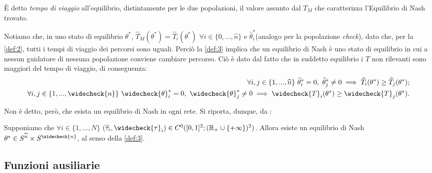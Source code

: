È detto \textit{tempo di viaggio} all'equilibrio, distintamente per le due popolazioni, il valore assunto dal $T_M$ che caratterizza l'Equilibrio di Nash trovato.

Notiamo che, in uno stato di equilibrio $\theta^*$, $\widehat{T}_M(\theta^*)=\widehat{T}_i(\theta^*)$ $\forall i\in\{0,...,\widehat{n}\}$ e $\widehat{\theta}^*_i$(analogo per la popolazione \textit{check}),
dato che, per la \autoref{def:2}, tutti i tempi di viaggio dei percorsi sono uguali. Perciò la \autoref{def:3}
implica che un equilibrio di Nash è uno stato di equilibrio in cui a nessun guidatore di nessuna popolazione conviene cambiare percorso.
Ciò è dato dal fatto che in suddetto equilibrio i $T$ non rilevanti sono 
maggiori del tempo di viaggio, di conseguenza:
\begin{equation*}
    \begin{split}
    \forall i,j\in\{1,...,\widehat{n}\}\text{ }\widehat{\theta}_i^{*}=0,\text{ }\widehat{\theta}_j^*\neq0\implies\widehat{T}_i(\theta^*)\geq\widehat{T}_j(\theta^*);\\
    \forall i,j\in\{1,...,\widecheck{n}\}\text{ }\widecheck{\theta}_i^{*}=0,\text{ }\widecheck{\theta}_j^*\neq0\implies\widecheck{T}_i(\theta^*)\geq\widecheck{T}_j(\theta^*).
    \end{split}
\end{equation*}

Non è detto, però, che esista un equilibrio di Nash in ogni rete. Si riporta, dunque, da \cite[Cap. 2]{MR4911797}:
\begin{theorem}\label{th:1}
    Supponiamo che $\forall i\in\{1,...,N\}$ $(\widehat{\tau}_i,\widecheck{\tau}_i)\in C^0([0,1]^2;(\mathbb{R}_+\cup\{+\infty\})^2)$.
    Allora esiste un equilibrio di Nash $\theta^*\in S^{\widehat{n}}\times S^{\widecheck{n}}$, al senso della \autoref{def:3}.
\end{theorem}

\subsection{Funzioni ausiliarie}
\label{subsec:FunzAus}

